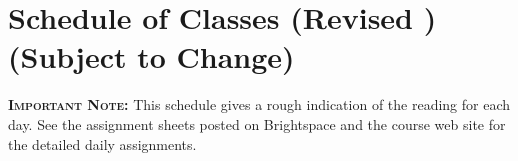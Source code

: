 \documentclass[11pt,twoside]{jgsyllabus}\usepackage[]{graphicx}\usepackage[]{xcolor}
\begin{document}
\clearpage
\appendix
\setcounter{secnumdepth}{0}
\newcommand{\maybehline}{\hline}%
\setlength\extrarowheight{4pt}
\section[Class Schedule]{Schedule of Classes
\ifrevised
	(Revised \RevisionDate)%
\else
	(Subject to Change)%
\fi}

\textbf{\scshape Important Note:} This schedule gives a rough indication of the
reading for each day. See the assignment sheets posted on Brightspace
and the course web site for the detailed daily assignments.

\setlength{\aboverulesep}{0.2ex}
\setlength{\belowrulesep}{0.2ex}
\setlength{\extrarowheight}{0.1ex}
\setlength{\heavyrulewidth}{0.5pt}
\setlength{\lightrulewidth}{0.05pt}
\end{document}

